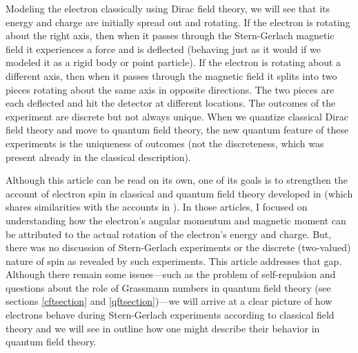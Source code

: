 \documentclass[onecolumn,secnumarabic,amsmath,amssymb,balancelastpage,nofootinbib]{article}
\begin{document}
Modeling the electron classically using Dirac field theory, we will see that its energy and charge are initially spread out and rotating.  If the electron is rotating about the right axis, then when it passes through the Stern-Gerlach magnetic field it experiences a force and is deflected (behaving just as it would if we modeled it as a rigid body or point particle).  If the electron is rotating about a different axis, then when it passes through the magnetic field it splits into two pieces rotating about the same axis in opposite directions.  The two pieces are each deflected and hit the detector at different locations.  The outcomes of the experiment are discrete but not always unique.  When we quantize classical Dirac field theory and move to quantum field theory, the new quantum feature of these experiments is the uniqueness of outcomes (not the discreteness, which was present already in the classical description).

Although this article can be read on its own, one of its goals is to strengthen the account of electron spin in classical and quantum field theory developed in \citet{howelectronsspin, positrons} (which shares similarities with the accounts in \citealp{ohanian, chuu2010}).  In those articles, I focused on understanding how the electron's angular momentum and magnetic moment can be attributed to the actual rotation of the electron's energy and charge.  But, there was no discussion of Stern-Gerlach experiments or the discrete (two-valued) nature of spin as revealed by such experiments.  This article addresses that gap.  Although there remain some issues---such as the problem of self-repulsion and questions about the role of Grassmann numbers in quantum field theory (see sections \ref{cftsection} and \ref{qftsection})---we will arrive at a clear picture of how electrons behave during Stern-Gerlach experiments according to classical field theory and we will see in outline how one might describe their behavior in quantum field theory.
\end{document}
